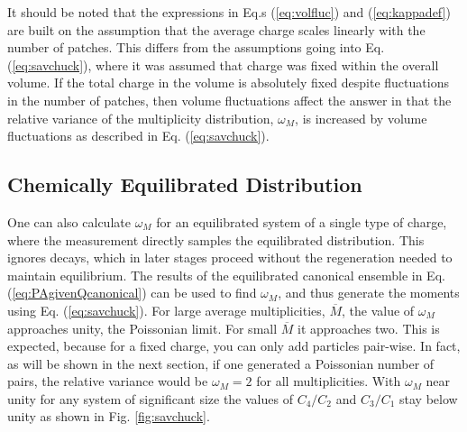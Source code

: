 It should be noted that the expressions in Eq.s (\ref{eq:volfluc}) and (\ref{eq:kappadef}) are built on the assumption that the average charge scales linearly with the number of patches. This differs from the assumptions going into Eq. (\ref{eq:savchuck}), where it was assumed that charge was fixed within the overall volume. If the total charge in the volume is absolutely fixed despite fluctuations in the number of patches, then volume fluctuations affect the answer in that the relative variance of the multiplicity distribution, $\omega_M$, is increased by volume fluctuations as described in Eq. (\ref{eq:savchuck}).

\subsection{Chemically Equilibrated Distribution}

One can also calculate $\omega_M$ for an equilibrated system of a single type of charge, where the measurement directly samples the equilibrated distribution. This ignores decays, which in later stages proceed without the regeneration needed to maintain equilibrium. The results of the equilibrated canonical ensemble in Eq. (\ref{eq:PAgivenQcanonical}) can be used to find $\omega_M$, and thus generate the moments using Eq. (\ref{eq:savchuck}). For large average multiplicities, $\overline{M}$, the value of $\omega_M$ approaches unity, the Poissonian limit. For small $\overline{M}$ it approaches two. This is expected, because for a fixed charge, you can only add particles pair-wise. In fact, as will be shown in the next section, if one generated a Poissonian number of pairs, the relative variance would be $\omega_M=2$ for all multiplicities. With $\omega_M$ near unity for any system of significant size the values of $C_4/C_2$ and $C_3/C_1$ stay below unity as shown in Fig. \ref{fig:savchuck}. 

